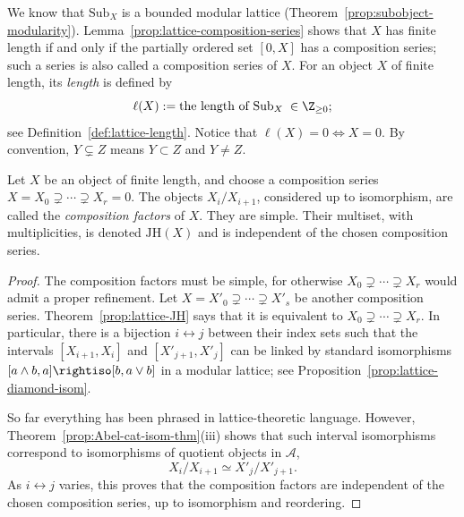 We know that $\mathrm{Sub}_X$ is a bounded modular lattice
(Theorem~\ref{prop:subobject-modularity}). Lemma~\ref{prop:lattice-composition-series}
shows that $X$ has finite length if and only if the partially ordered set
$[0,X]$ has a composition series; such a series is also called a composition
series of $X$. For an object $X$ of finite length, its \emph{length} is
defined by 
\[ \ell(X) := \text{the length of }\mathrm{Sub}_X\;\in\Z_{\geq0}; \]
see Definition~\ref{def:lattice-length}. Notice that
$\ell(X)=0\iff X=0$. By convention, $Y\subsetneq Z$ means $Y\subset Z$ and
$Y\neq Z$.

\begin{definition-theorem}\label{def:JH}
	\sloppy
	Let $X$ be an object of finite length, and choose a composition series
	$X=X_0\supsetneq\cdots\supsetneq X_r=0$. The objects $X_i/X_{i+1}$,
	considered up to isomorphism, are called the \emph{composition factors} of
	$X$. They are simple. Their multiset, with multiplicities, is denoted
	$\mathrm{JH}(X)$ and is independent of the chosen composition series.
	\fussy
\end{definition-theorem}
\begin{proof}
	The composition factors must be simple, for otherwise
	$X_0\supsetneq\cdots\supsetneq X_r$ would admit a proper refinement. Let
	$X=X'_0\supsetneq\cdots\supsetneq X'_s$ be another composition series.
	Theorem~\ref{prop:lattice-JH} says that it is equivalent to
	$X_0\supsetneq\cdots\supsetneq X_r$. In particular, there is a bijection
	$i\leftrightarrow j$ between their index sets such that the intervals
	$\left[X_{i+1},X_i\right]$ and $\left[X'_{j+1},X'_j\right]$ can be linked by standard
	isomorphisms $[a\wedge b,a]\rightiso[b,a\vee b]$ in a modular lattice;
	see Proposition~\ref{prop:lattice-diamond-isom}.

	So far everything has been phrased in lattice-theoretic language. However,
	Theorem~\ref{prop:Abel-cat-isom-thm}(iii) shows that such interval
	isomorphisms correspond to isomorphisms of quotient objects in
	$\mathcal{A}$,
	\[ X_i/X_{i+1} \simeq X'_j/X'_{j+1}. \]
	As $i\leftrightarrow j$ varies, this proves that the composition factors
	are independent of the chosen composition series, up to isomorphism and
	reordering.
\end{proof}

